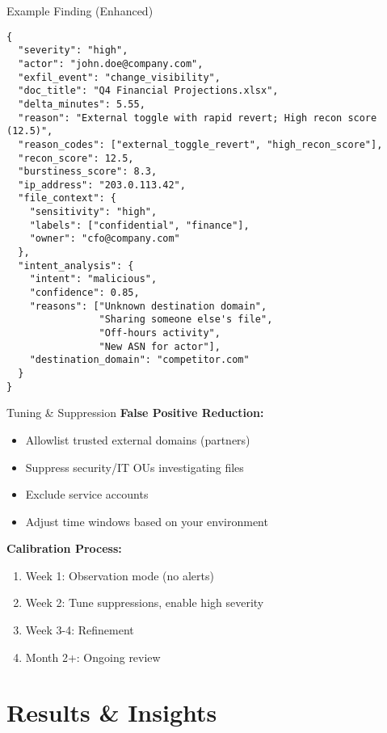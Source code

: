 \documentclass[aspectratio=169]{beamer}
\begin{document}
\begin{frame}[fragile]{Example Finding (Enhanced)}
\begin{lstlisting}[basicstyle=\ttfamily\tiny]
{
  "severity": "high",
  "actor": "john.doe@company.com",
  "exfil_event": "change_visibility",
  "doc_title": "Q4 Financial Projections.xlsx",
  "delta_minutes": 5.55,
  "reason": "External toggle with rapid revert; High recon score (12.5)",
  "reason_codes": ["external_toggle_revert", "high_recon_score"],
  "recon_score": 12.5,
  "burstiness_score": 8.3,
  "ip_address": "203.0.113.42",
  "file_context": {
    "sensitivity": "high",
    "labels": ["confidential", "finance"],
    "owner": "cfo@company.com"
  },
  "intent_analysis": {
    "intent": "malicious",
    "confidence": 0.85,
    "reasons": ["Unknown destination domain",
                "Sharing someone else's file",
                "Off-hours activity",
                "New ASN for actor"],
    "destination_domain": "competitor.com"
  }
}
\end{lstlisting}
\end{frame}

\begin{frame}{Tuning \& Suppression}
\textbf{False Positive Reduction:}
\begin{itemize}
    \item Allowlist trusted external domains (partners)
    \item Suppress security/IT OUs investigating files
    \item Exclude service accounts
    \item Adjust time windows based on your environment
\end{itemize}

\vspace{1em}

\textbf{Calibration Process:}
\begin{enumerate}
    \item Week 1: Observation mode (no alerts)
    \item Week 2: Tune suppressions, enable high severity
    \item Week 3-4: Refinement
    \item Month 2+: Ongoing review
\end{enumerate}
\end{frame}

\section{Results \& Insights}
\end{document}
